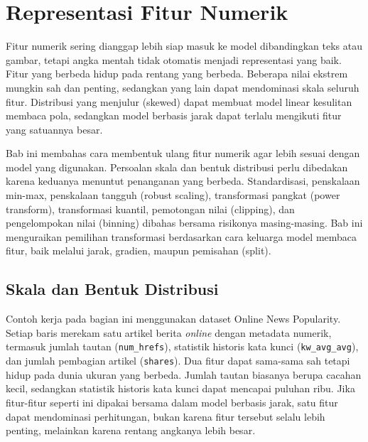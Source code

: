 \chapter{Representasi Fitur Numerik}\label{representasi-fitur-numerik}

Fitur numerik sering dianggap lebih siap masuk ke model dibandingkan teks atau gambar, tetapi angka mentah tidak otomatis menjadi representasi yang baik. Fitur yang berbeda hidup pada rentang yang berbeda. Beberapa nilai ekstrem mungkin sah dan penting, sedangkan yang lain dapat mendominasi skala seluruh fitur. Distribusi yang menjulur (skewed) dapat membuat model linear kesulitan membaca pola, sedangkan model berbasis jarak dapat terlalu mengikuti fitur yang satuannya besar.

Bab ini membahas cara membentuk ulang fitur numerik agar lebih sesuai dengan model yang digunakan. Persoalan skala dan bentuk distribusi perlu dibedakan karena keduanya menuntut penanganan yang berbeda. Standardisasi, penskalaan min-max, penskalaan tangguh (robust scaling), transformasi pangkat (power transform), transformasi kuantil, pemotongan nilai (clipping), dan pengelompokan nilai (binning) dibahas bersama risikonya masing-masing. Bab ini menguraikan pemilihan transformasi berdasarkan cara keluarga model membaca fitur, baik melalui jarak, gradien, maupun pemisahan (split).

\section{Skala dan Bentuk Distribusi}\label{skala-dan-bentuk-distribusi}

Contoh kerja pada bagian ini menggunakan dataset Online News Popularity. Setiap baris merekam satu artikel berita \emph{online} dengan metadata numerik, termasuk jumlah tautan (\passthrough{\lstinline!num_hrefs!}), statistik historis kata kunci (\passthrough{\lstinline!kw_avg_avg!}), dan jumlah pembagian artikel (\passthrough{\lstinline!shares!}). Dua fitur dapat sama-sama sah tetapi hidup pada dunia ukuran yang berbeda. Jumlah tautan biasanya berupa cacahan kecil, sedangkan statistik historis kata kunci dapat mencapai puluhan ribu. Jika fitur-fitur seperti ini dipakai bersama dalam model berbasis jarak, satu fitur dapat mendominasi perhitungan, bukan karena fitur tersebut selalu lebih penting, melainkan karena rentang angkanya lebih besar.

